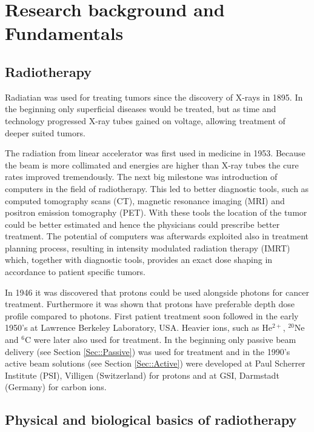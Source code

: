 \documentclass[type=dr, dr=rernat, accentcolor=tud7b,colorbacktitle, bigchapter, openright, twoside, 12pt ]{tudthesis}
\begin{document}
\chapter{Research background and Fundamentals}
\label{chapter:intro}
\minitoc

\section{Radiotherapy}

Radiatian was used for treating tumors since the discovery of X-rays in 1895. In the beginning only superficial diseases would be treated, but as time and technology progressed X-ray tubes gained on voltage, allowing treatment of deeper suited tumors.

The radiation from linear accelerator was first used in medicine in 1953. Because the beam is more collimated and energies are
higher than X-ray tubes the cure rates improved tremendously. The next big milestone was introduction of computers in the field
of radiotherapy. This led to better diagnostic tools, such as computed tomography scans (CT), magnetic resonance imaging (MRI) and
positron emission tomography (PET). With these tools the location of the tumor could be better estimated and hence the physicians
could prescribe better treatment. The potential of computers was afterwards exploited also in treatment planning process, resulting in intensity modulated
radiation therapy (IMRT) which, together with diagnostic tools, provides an exact dose shaping in accordance to patient specific tumors.

In 1946 it was discovered that protons could be used alongside photons for cancer treatment. Furthermore it was shown that protons have preferable depth dose profile compared to photons. First patient treatment soon followed in the early 1950's at Lawrence Berkeley Laboratory, USA. Heavier ions, such as 
He$^{2+}$, $^{20}$Ne and $^6$C were later also used for treatment. In the beginning only passive beam delivery (see Section \ref{Sec::Passive}) was used for treatment and in the 1990's active beam solutions (see Section \ref{Sec::Active}) were developed at Paul Scherrer Institute (PSI), Villigen (Switzerland) for protons and at GSI, Darmstadt (Germany) for carbon ions.


\section{Physical and biological basics of radiotherapy}
\end{document}
